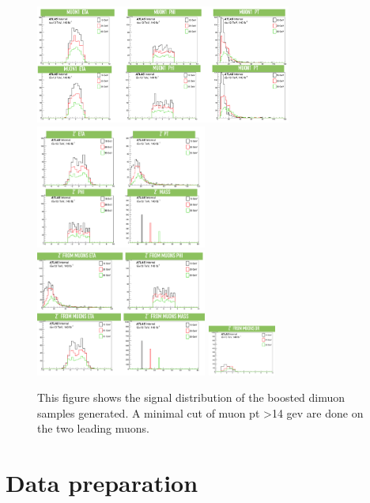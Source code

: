 \begin{figure}[!htb]
    \begin{center}
        \includegraphics[width=0.75\textwidth]{figures/chapter_dimuon/dimuonISRdist1}
        \includegraphics[width=0.5\textwidth]{figures/chapter_dimuon/dimuonISRdist2}
        \includegraphics[width=0.5\textwidth]{figures/chapter_dimuon/dimuonISRdist3}
        \includegraphics[width=0.2\textwidth]{figures/chapter_dimuon/dimuonISRdist4}
        \caption{
        This figure shows the signal distribution of the boosted dimuon samples generated. A minimal cut of muon pt >14 gev are done on the two leading muons. }
       \label{fig:boosted}
    \end{center}
\end{figure}


\section{Data preparation}

